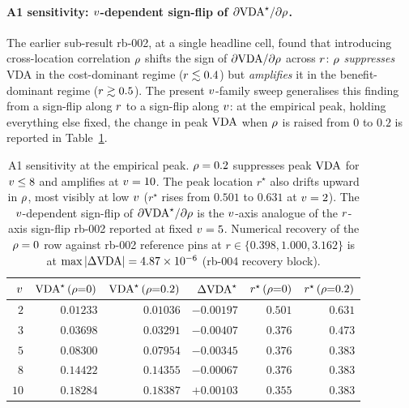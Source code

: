 \paragraph{A1 sensitivity: $v$-dependent sign-flip of
$\partial \mathrm{VDA}^\star / \partial \rho$.}
The earlier sub-result rb-002, at a single headline cell, found that
introducing cross-location correlation $\rho$ shifts the sign of
$\partial \mathrm{VDA} / \partial \rho$ across $r$: $\rho$
\emph{suppresses} VDA in the cost-dominant regime
($r \lesssim 0.4$) but \emph{amplifies} it in the
benefit-dominant regime ($r \gtrsim 0.5$). The present
$v$-family sweep generalises this finding from a sign-flip
along $r$ to a sign-flip along $v$: at the empirical peak,
holding everything else fixed, the change in peak $\mathrm{VDA}$ when
$\rho$ is raised from $0$ to $0.2$ is reported in
Table~\ref{tab:rho-sensitivity}.
%
\begin{table}[t]
  \centering
  \small
  \begin{tabular}{r r r r r r}
    \toprule
    $v$ &
    $\mathrm{VDA}^\star\,(\rho{=}0)$ &
    $\mathrm{VDA}^\star\,(\rho{=}0.2)$ &
    $\Delta \mathrm{VDA}^\star$ &
    $r^\star\,(\rho{=}0)$ &
    $r^\star\,(\rho{=}0.2)$ \\
    \midrule
    $2$  & $0.01233$ & $0.01036$ & $-0.00197$ & $0.501$ & $0.631$ \\
    $3$  & $0.03698$ & $0.03291$ & $-0.00407$ & $0.376$ & $0.473$ \\
    $5$  & $0.08300$ & $0.07954$ & $-0.00345$ & $0.376$ & $0.383$ \\
    $8$  & $0.14422$ & $0.14355$ & $-0.00067$ & $0.376$ & $0.383$ \\
    $10$ & $0.18284$ & $0.18387$ & $\mathbf{+0.00103}$ & $0.355$ & $0.383$ \\
    \bottomrule
  \end{tabular}
  \caption{A1 sensitivity at the empirical peak. $\rho = 0.2$
  suppresses peak $\mathrm{VDA}$ for $v \le 8$ and amplifies at $v = 10$.
  The peak location $r^\star$ also drifts upward in $\rho$, most
  visibly at low $v$ ($r^\star$ rises from $0.501$ to $0.631$ at
  $v = 2$). The $v$-dependent sign-flip of
  $\partial \mathrm{VDA}^\star / \partial \rho$ is the $v$-axis analogue
  of the $r$-axis sign-flip rb-002 reported at fixed $v = 5$.
  Numerical recovery of the $\rho = 0$ row against rb-002 reference
  pins at $r \in \{0.398, 1.000, 3.162\}$ is at $\max|\Delta\mathrm{VDA}| =
  4.87 \times 10^{-6}$ (rb-004 recovery block).}
  \label{tab:rho-sensitivity}
\end{table}

